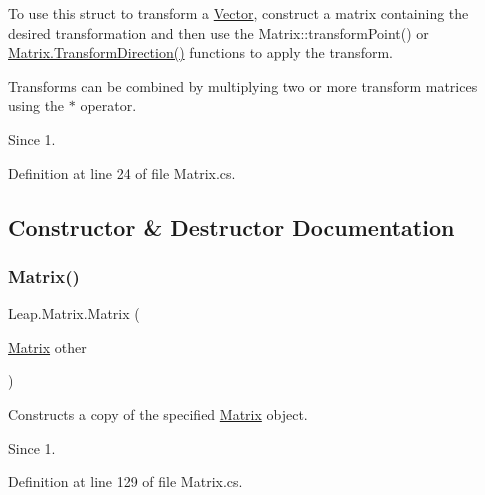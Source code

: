 To use this struct to transform a \mbox{\hyperlink{struct_leap_1_1_vector}{Vector}}, construct a matrix containing the desired transformation and then use the Matrix\+::transform\+Point() or \mbox{\hyperlink{struct_leap_1_1_matrix_a64110864a06e02eb50977596633d39a6}{Matrix.\+Transform\+Direction()}} functions to apply the transform.

Transforms can be combined by multiplying two or more transform matrices using the $\ast$ operator. \begin{DoxySince}{Since}
1. 
\end{DoxySince}


Definition at line 24 of file Matrix.\+cs.



\subsection{Constructor \& Destructor Documentation}
\mbox{\label{struct_leap_1_1_matrix_a0070eab9ad17515aec4d27e93c8037bb}} 
\subsubsection{\texorpdfstring{Matrix()}{Matrix()}\hspace{0.1cm}{\footnotesize\ttfamily [1/7]}}
{\footnotesize\ttfamily Leap.\+Matrix.\+Matrix (\begin{DoxyParamCaption}\item[{\mbox{\hyperlink{struct_leap_1_1_matrix}{Matrix}}}]{other }\end{DoxyParamCaption})}



Constructs a copy of the specified \mbox{\hyperlink{struct_leap_1_1_matrix}{Matrix}} object. 

\begin{DoxySince}{Since}
1. 
\end{DoxySince}


Definition at line 129 of file Matrix.\+cs.

\mbox{\label{struct_leap_1_1_matrix_a47bc47324a84f42179a8717fa4f40817}} 
